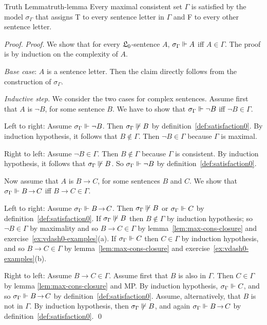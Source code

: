 \begin{lemma}{Truth Lemma}{truth-lemma}
  Every maximal consistent set $\Gamma$ is satisfied by
  the model $\sigma_{\Gamma}$ that
  assigns T to every sentence letter in $\Gamma$ and F to every other sentence letter.
\end{lemma}
\begin{proof}
  \emph{Proof.}
  We show that for every $\mathfrak{L}_0$-sentence $A$,
  $\sigma_\Gamma \Vdash A$ iff $A \in \Gamma$.
  The proof is by induction on the complexity of $A$.

  \emph{Base case}:
  $A$ is a sentence letter.
  Then the claim directly follows from the construction of $\sigma_\Gamma$.

  \emph{Inductive step}.
  We consider the two cases for complex sentences.
  Assume first that $A$ is $\neg B$,
  for some sentence $B$.
  We have to show that $\sigma_\Gamma \Vdash \neg B$ iff $\neg B \in \Gamma$.
  
  Left to right:
  Assume $\sigma_\Gamma \Vdash \neg B$.
  Then $\sigma_\Gamma \not\Vdash B$ by definition~\ref{def:satisfaction0}.
  By induction hypothesis,
  it follows that $B \not\in \Gamma$.
  Then $\neg B \in \Gamma$ because $\Gamma$ is maximal.

  Right to left:
  Assume $\neg B \in \Gamma$.
  Then $B \not\in \Gamma$ because $\Gamma$ is consistent.
  By induction hypothesis,
  it follows that
  $\sigma_\Gamma \not\Vdash B$.
  So $\sigma_\Gamma \Vdash \neg B$ by definition~\ref{def:satisfaction0}.

  Now assume that $A$ is $B \to C$,
  for some sentences $B$ and $C$.
  We show that $\sigma_\Gamma \satisfies B \to C$ iff $B \to C \in \Gamma$.

  Left to right:
  Assume $\sigma_\Gamma \satisfies B \to C$.
  Then $\sigma_\Gamma \not\Vdash B$ or $\sigma_\Gamma \Vdash C$ by definition~\ref{def:satisfaction0}.
  If $\sigma_\Gamma \not\Vdash B$ then $B \not\in \Gamma$ by induction hypothesis;
  so $\neg B \in \Gamma$ by maximality
  and so $B \to C \in \Gamma$ by lemma~\ref{lem:max-cons-closure} and exercise~\ref{ex:vdash0-examples}(a).
  If $\sigma_\Gamma \Vdash C$ then $C \in \Gamma$ by induction hypothesis,
  and so $B \to C \in \Gamma$ by lemma~\ref{lem:max-cons-closure} and exercise~\ref{ex:vdash0-examples}(b).

  Right to left:
  Assume $B \to C \in \Gamma$.
  Assume first that $B$ is also in $\Gamma$.
  Then $C \in \Gamma$ by lemma \ref{lem:max-cons-closure} and MP.
  By induction hypothesis,
  $\sigma_\Gamma \Vdash C$,
  and so $\sigma_\Gamma \satisfies B \to C$ by definition~\ref{def:satisfaction0}.
  Assume, alternatively, that $B$ is not in $\Gamma$.
  By induction hypothesis,
  then $\sigma_\Gamma \not\Vdash B$,
  and again $\sigma_\Gamma \satisfies B \to C$ by definition~\ref{def:satisfaction0}.
  \qed
\end{proof}

